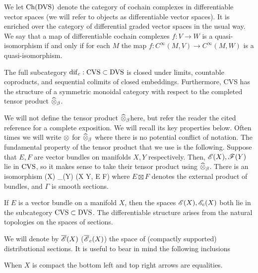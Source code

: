 \documentclass[10pt]{amsart}
\begin{document}
We let ${\rm Ch}({\rm DVS})$ denote the category of cochain complexes in differentiable vector spaces (we will refer to objects as differentiable vector spaces). 
It is enriched over the category of differential graded vector spaces in the usual way.
We say that a map of differentiable cochain complexes $f : V \to W$ is a quasi-isomorphism if and only if for each $M$ the map $f : C^\infty(M, V) \to C^\infty(M,W)$ is a quasi-isomorphism.

\begin{thm}
The full subcategory ${\rm dif}_c : {\rm CVS} \subset {\rm DVS}$ is closed under limits, countable coproducts, and sequential colimits of closed embeddings. 
Furthermore, {\rm CVS} has the structure of a symmetric monoidal category with respect to the completed tensor product $\widehat{\otimes}_{\beta}$. 
\end{thm}

We will not define the tensor product $\widehat{\otimes}_\beta$here, but refer the reader the cited reference for a complete exposition.
We will recall its key properties below.
Often times we will write $\otimes$ for $\widehat{\otimes}_\beta$ where there is no potential conflict of notation. 
The fundamental property of the tensor product that we use is the following.
Suppose that $E,F$ are vector bundles on manifolds $X,Y$ respectively.
Then, $\mathscr E(X), \mathscr F(Y)$ lie in ${\rm CVS}$, so it makes sense to take their tensor product using $\widehat{\otimes}_\beta$. 
There is an isomorphism
\be\label{tensor1}
\sE(X) \Hat{\tensor}_\beta \sF(Y) \cong \Gamma(X \times Y, E \boxtimes F)
\ee
where $E \boxtimes F$ denotes the external product of bundles, and $\Gamma$ is smooth sections. 

If $E$ is a vector bundle on a manifold $X$, then the spaces $\mathscr E(X), \mathscr E_c(X)$ both lie in the subcategory ${\rm CVS} \subset {\rm DVS}$. 
The differentiable structure arises from the natural topologies on the spaces of sections. 

We will denote by $\overline{\mathscr E}(X)$ ($\overline{\mathscr E}_c(X)$) the space of (compactly supported) distributional sections.
It is useful to bear in mind the following inclusions
\ben
{}
\een
When $X$ is compact the bottom left and top right arrows are equalities.
\end{document}
